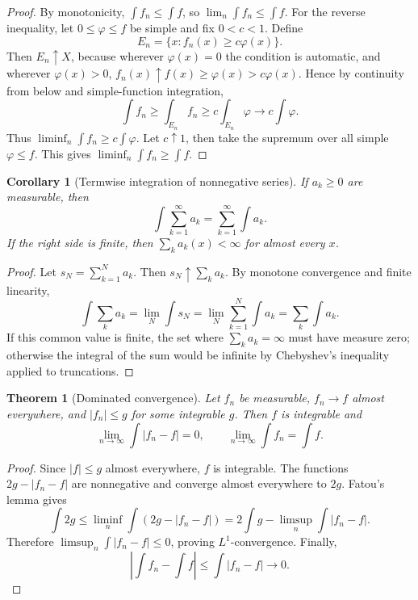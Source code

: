 \documentclass[11pt,openany]{book}
\numberwithin{equation}{chapter}
\theoremstyle{definition}
\theoremstyle{plain}
\newtheorem{theorem}[definition]{Theorem}
\newtheorem{corollary}[definition]{Corollary}
\theoremstyle{remark}
\newcommand{\1}{\mathbf{1}}
\newcommand{\abs}[1]{\left\lvert #1\right\rvert}
\begin{document}
\begin{proof}
By monotonicity, \(\int f_n\le\int f\), so \(\lim_n\int f_n\le\int f\).  For the reverse inequality, let \(0\le\varphi\le f\) be simple and fix \(0<c<1\).  Define
\[
    E_n=\{x:f_n(x)\ge c\varphi(x)\}.
\]
Then \(E_n\uparrow X\), because wherever \(\varphi(x)=0\) the condition is automatic, and wherever \(\varphi(x)>0\), \(f_n(x)\uparrow f(x)\ge\varphi(x)>c\varphi(x)\).  Hence by continuity from below and simple-function integration,
\[
    \int f_n\ge\int_{E_n} f_n\ge c\int_{E_n}\varphi\to c\int\varphi.
\]
Thus \(\liminf_n\int f_n\ge c\int\varphi\).  Let \(c\uparrow1\), then take the supremum over all simple \(\varphi\le f\).  This gives \(\liminf_n\int f_n\ge\int f\).
\end{proof}

\begin{corollary}[Termwise integration of nonnegative series]
If \(a_k\ge0\) are measurable, then
\[
    \int\sum_{k=1}^\infty a_k=\sum_{k=1}^\infty\int a_k.
\]
If the right side is finite, then \(
\sum_ka_k(x)<\infty\) for almost every \(x\).
\end{corollary}

\begin{proof}
Let \(s_N=\sum_{k=1}^N a_k\).  Then \(s_N\uparrow\sum_ka_k\).  By monotone convergence and finite linearity,
\[
    \int\sum_ka_k=\lim_N\int s_N=\lim_N\sum_{k=1}^N\int a_k=\sum_k\int a_k.
\]
If this common value is finite, the set where \(\sum_ka_k=\infty\) must have measure zero; otherwise the integral of the sum would be infinite by Chebyshev's inequality applied to truncations.
\end{proof}

\begin{theorem}[Dominated convergence]
Let \(f_n\) be measurable, \(f_n\to f\) almost everywhere, and \(\abs{f_n}\le g\) for some integrable \(g\).  Then \(f\) is integrable and
\[
    \lim_{n\to\infty}\int\abs{f_n-f}=0,
    \qquad
    \lim_{n\to\infty}\int f_n=\int f.
\]
\end{theorem}

\begin{proof}
Since \(\abs f\le g\) almost everywhere, \(f\) is integrable.  The functions \(2g-\abs{f_n-f}\) are nonnegative and converge almost everywhere to \(2g\).  Fatou's lemma gives
\[
    \int 2g\le \liminf_n\int(2g-\abs{f_n-f})
    =2\int g-\limsup_n\int\abs{f_n-f}.
\]
Therefore \(\limsup_n\int\abs{f_n-f}\le0\), proving \(L^1\)-convergence.  Finally,
\[
    \abs{\int f_n-\int f}\le\int\abs{f_n-f}\to0.
\]
\end{proof}
\end{document}
